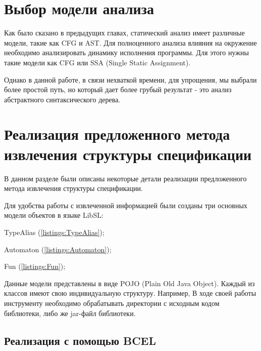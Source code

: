 \section{Выбор модели анализа}

Как было сказано в предыдущих главах, статический анализ имеет различные модели, такие как CFG и AST.
Для полноценного анализа влияния на окружение необходимо анализировать динамику исполнения программы.
Для этого нужны такие модели как CFG или SSA (Single Static Assignment).

Однако в данной работе, в связи нехваткой времени, для упрощения, мы выбрали более простой путь, но который дает более грубый результат - это анализ абстрактного синтаксического дерева.


\section{Реализация предложенного метода извлечения структуры спецификации}

В данном разделе были описаны некоторые детали реализации предложенного метода извлечения структуры спецификации.

Для удобства работы с извлеченной информацией были созданы три основных модели объектов в языке LibSL:
%
\begin{itemize*}
\item TypeAlias (\ref{listings:TypeAlias});
\item Automaton (\ref{listings:Automaton});
\item Fun (\ref{listings:Fun});
\end{itemize*}
%

Данные модели представлены в виде POJO (Plain Old Java Object). Каждый из классов имеют свою индивидуальную структуру. Например,
В ходе своей работы инструменту необходимо обрабатывать директории с исходным кодом библиотеки, либо же jar-файл библиотеки.

\subsection{Реализация с помощью BCEL}

